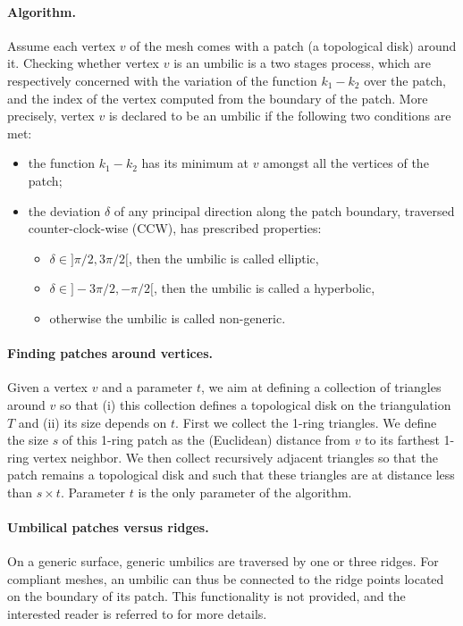 \paragraph{Algorithm.}
Assume each vertex $v$ of the mesh comes with a patch (a topological
disk) around it. Checking whether vertex $v$ is an umbilic is a two
stages process, which are respectively concerned with the variation
of the function $k_1-k_2$ over the patch, and the index of the vertex
computed from the boundary of the patch. More precisely, vertex $v$ is
declared to be an umbilic if the following two conditions are met:
\begin{itemize}
\item
the function $k_1-k_2$ has its minimum at $v$ amongst all the
vertices of the patch;
\item
the deviation $\delta$ of any principal direction along the patch
boundary, traversed counter-clock-wise (CCW), has prescribed
properties:
\begin{itemize}
\item
$\delta \in ]\pi/2,3\pi/2[$, then the umbilic is called elliptic,
\item
$\delta \in ]-3\pi/2,-\pi/2[$, then the umbilic is called a hyperbolic,
\item
otherwise the umbilic is called non-generic.
\end{itemize}
\end{itemize}

\paragraph{Finding patches around vertices.}
Given a vertex $v$ and a parameter $t$, we aim at defining a
collection of triangles around $v$ so that (i) this collection defines
a topological disk on the triangulation $T$ and (ii) its size depends
on $t$. First we collect the 1-ring triangles. We define the size $s$
of this 1-ring patch as the (Euclidean) distance from $v$ to its
farthest 1-ring vertex neighbor. We then collect recursively adjacent
triangles so that the patch remains a topological disk and such that
these triangles are at distance less than $s\times t$. Parameter $t$
is the only parameter of the algorithm.

\paragraph{Umbilical patches versus ridges.} On a generic surface,
generic umbilics are traversed by one or three ridges. For compliant
meshes, an umbilic can thus be connected to the ridge points located
on the boundary of its patch. This functionality is not provided, and
the interested reader is referred to \cite{cgal:cp-tdare-05} for more
details.

